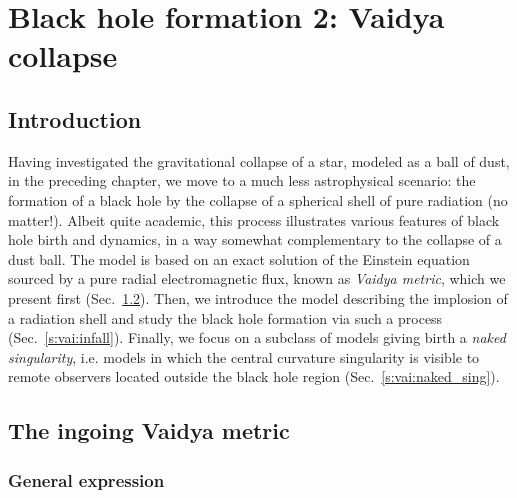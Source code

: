 \chapter{Black hole formation 2: Vaidya collapse}
\label{s:vai}

\minitoc

\section{Introduction}

Having investigated the gravitational collapse of a star, modeled as a ball of dust,
in the preceding chapter, we move to a much less astrophysical scenario: the
formation of a black hole by the collapse of a spherical shell of pure radiation
(no matter!).
Albeit quite academic, this process illustrates various features of black hole birth and dynamics,
in a way somewhat complementary to the collapse of a dust ball.
The model is based on an exact solution of the Einstein equation sourced by
a pure radial electromagnetic flux, known as \emph{Vaidya metric}, which
we present first (Sec.~\ref{s:vai:Vaidya_metric}).
Then, we introduce the
model describing the implosion of a radiation shell and
study the black hole formation via such a process (Sec.~\ref{s:vai:infall}).
Finally, we focus on a subclass of models giving birth a \emph{naked singularity}, i.e.
models in which the central curvature singularity is visible to remote observers located
outside the black hole region (Sec.~\ref{s:vai:naked_sing}).


\section{The ingoing Vaidya metric} \label{s:vai:Vaidya_metric}

\subsection{General expression} \label{s:vai:general}

